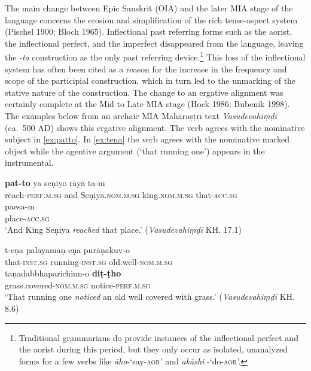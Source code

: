 \documentclass[output=paper,
modfonts
]{LSP/langsci}
\begin{document}
The main change between Epic Sanskrit (OIA) and the later MIA  stage of the
language concerns the erosion and simplification of the rich
tense-aspect system (Pischel 1900; Bloch 1965).  Inflectional past
referring forms such as the aorist, the inflectional perfect, and the
imperfect disappeared from the language, leaving the \textit{-ta}
construction as the only past referring device.\footnote{Traditional
  grammarians do provide instances of the inflectional perfect and the
  aorist during this period, but they only occur as isolated,
  unanalyzed forms for a few verbs like \textit{āha}-`say-\textsc{aor}'
  and \textit{akāshi} -`do-\textsc{aor}'.}  This loss of the
inflectional system has often been cited as a reason for the increase
in the frequency and scope of the participial construction, which in turn
led to the unmarking of the stative nature of the construction. The change to an ergative alignment was certainly complete at the  Mid to Late MIA stage  (Hock 1986; Bubenik
1998).  The examples below from an archaic MIA
Mahāraṣṭrī text \textit{Vasudevahiṃḍī}
(ca.\ 500 AD) shows this ergative alignment. The verb agrees with the
nominative subject in \cref{ex:patto}. In \cref{ex:tena} the verb agrees with
the nominative marked object while the agentive argument (`that running
one') appears in the instrumental. 

\begin{exe}
\ex\label{ex:jkl}
\begin{xlist}
\ex\label{ex:patto}\gll \textbf{pat-to}  ya  seṇiyo  rāyā   ta-m  \\
reach-\textsc{perf.m.sg}  and  Seṇiya.\textsc{nom.m.sg}  king.\textsc{nom.m.sg}  that-\textsc{acc.sg}  \\

\gll paesa-m \\
place-\textsc{acc.sg} \\

\glt `And King  Seṇiya \textit{reached} that place.' (\textit{Vasudevahiṃḍī} KH. 17.1)

\ex\label{ex:tena}\gll t-eṇa  palāyamāṇ-eṇa  purāṇakuv-o \\
that-\textsc{inst.sg}  running-\textsc{inst.sg}  old.well-\textsc{nom.m.sg} \\

\gll taṇadabbhaparichinn-o  \textbf{diṭ-ṭho} \\
grass.covered-\textsc{nom.m.sg}  notice-\textsc{perf.m.sg}\\

\glt `That running one \textit{noticed} an old well covered with grass.' (\textit{Vasudevahiṃḍī} KH. 8.6)
\end{xlist}
\end{exe}
\end{document}
